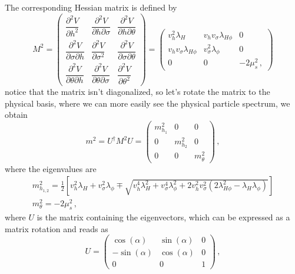 The corresponding Hessian matrix is defined by
\begin{equation}
	M^2=\left(\begin{array}{ccc}
		\dfrac{\partial^2V}{\partial h^2} & \dfrac{\partial^2V}{\partial h \partial\sigma} & \dfrac{\partial^2V}{\partial h \partial\theta} \\ [8pt]
		\dfrac{\partial^2V}{\partial \sigma \partial h} & \dfrac{\partial^2V}{\partial \sigma^2} & \dfrac{\partial^2V}{\partial \sigma \partial\theta} \\ [8pt]
		\dfrac{\partial^2V}{\partial \theta \partial h} & \dfrac{\partial^2V}{\partial \theta \partial\sigma} & \dfrac{\partial^2V}{\partial\theta^2}
	\end{array}\right)=\left(\begin{array}{ccc}
		v_h^2\lambda_H & v_hv_\sigma\lambda_{H\phi} & 0 \\
		v_hv_\sigma\lambda_{H\phi} & v_\sigma^2\lambda_\phi & 0 \\
		0 & 0 & -2\mu_s^2\,,
	\end{array}\right)
\end{equation}
notice that the matrix isn't diagonalized, so let's rotate the matrix to the physical basis, where we can more easily see the physical particle spectrum, we obtain
\begin{equation}
	m^2=U^\dag M^2 U = \left(\begin{array}{ccc}
		m^2_{h_1} & 0 & 0 \\
		0 & m^2_{h_2} & 0 \\
		0 & 0 & m^2_{\theta}
	\end{array}\right)\,,
\end{equation}
where the eigenvalues are
\begin{equation}
\label{masses}
	\begin{array}{c}
		m^2_{h_{1,2}}=\frac{1}{2}\left[v_h^2\lambda_H+v_\sigma^2\lambda_\phi\mp\sqrt{v_h^4\lambda_H^2+v_\sigma^4\lambda_\phi^2+2v_h^2v_\sigma^2(2\lambda_{H\phi}^2-\lambda_H\lambda_\phi)}\right] \\ 
		m^2_\theta=-2\mu_s^2\,,
	\end{array}
\end{equation}
where $U$ is the matrix containing the eigenvectors, which can be expressed as a matrix rotation and reads as
\begin{equation}
	U=\left(\begin{array}{lll}
		\cos(\alpha) & \sin(\alpha) & 0 \\
		-\sin(\alpha) & \cos(\alpha) & 0 \\
		0 & 0 & 1
	\end{array}\right)\,,
\end{equation}
